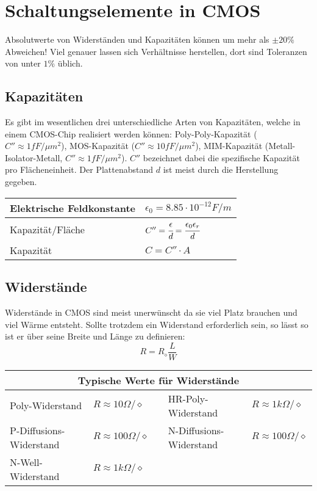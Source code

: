 \section{Schaltungselemente in CMOS}
Absolutwerte von Widerständen und Kapazitäten können um mehr als $\pm 20\%$ Abweichen! Viel genauer lassen sich Verhältnisse herstellen, dort sind Toleranzen von
unter $1\%$ üblich.

\subsection{Kapazitäten}
Es gibt im wesentlichen drei unterschiedliche Arten von Kapazitäten, welche in einem CMOS-Chip realisiert werden können: 
Poly-Poly-Kapazität ($C'' \approx 1fF/\mu m^2$),
MOS-Kapazität ($C'' \approx 10fF/\mu m^2$),
MIM-Kapazität (Metall-Isolator-Metall, $C'' \approx 1fF/\mu m^2$). $C''$ bezeichnet dabei die spezifische Kapazität pro Flächeneinheit.
Der Plattenabstand $d$ ist meist durch die Herstellung gegeben.

\begin{tabularx}{\linewidth}{|l|X|}
	\hline
	Elektrische Feldkonstante	& $\epsilon_0 = 8.85 \cdot 10^{-12} F/m$
	\\ \hline
	Kapazität/Fläche	& $C'' = \cfrac{\epsilon}{d} = \cfrac{\epsilon_0 \epsilon_r}{d}$
	\\ \hline
	Kapazität & $C = C'' \cdot A$
	\\ \hline
\end{tabularx}

\subsection{Widerstände}
Widerstände in CMOS sind meist unerwünscht da sie viel Platz brauchen und viel Wärme entsteht. Sollte trotzdem ein
Widerstand erforderlich sein, so lässt so ist er über seine Breite und Länge zu definieren:
\[
	R = R_\diamond \frac{L}{W}
\]

\begin{tabularx}{0.8\linewidth}{|l|l|X|l|l|}
	\hline
	\multicolumn{5}{|c|}{\textbf{Typische Werte für Widerstände}}
	\\ \hline
	Poly-Widerstand & $R \approx 10 \Omega/\diamond$ & & HR-Poly-Widerstand & $R \approx 1k\Omega/\diamond$
	\\ \hline
	P-Diffusions-Widerstand & $R \approx 100\Omega/\diamond$ & & N-Diffusions-Widerstand & $R \approx 100\Omega/\diamond$
	\\ \hline
	N-Well-Widerstand & $R \approx 1k\Omega/\diamond$ & & &
	\\ \hline
\end{tabularx}